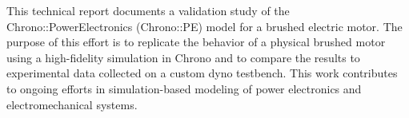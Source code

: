 This technical report documents a validation study of the Chrono::PowerElectronics (Chrono::PE) model for a brushed electric motor. The purpose of this effort is to replicate the behavior of a physical brushed motor using a high-fidelity simulation in Chrono and to compare the results to experimental data collected on a custom dyno testbench. This work contributes to ongoing efforts in simulation-based modeling of power electronics and electromechanical systems.
